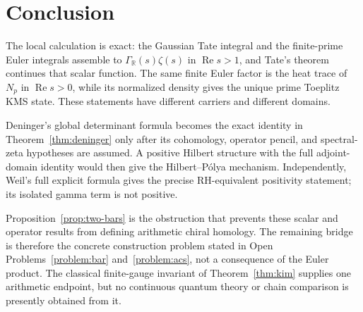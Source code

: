 \documentclass[11pt]{article}
\theoremstyle{plain}
\theoremstyle{definition}
\theoremstyle{remark}
\newcommand{\GammaR}{\Gamma_{\mathbb R}}
\begin{document}
\section{Conclusion}

The local calculation is exact: the Gaussian Tate integral and the
finite-prime Euler integrals assemble to \(\GammaR(s)\zeta(s)\) in
\(\operatorname{Re}s>1\), and Tate's theorem continues that scalar
function.  The same finite Euler factor is the heat trace of \(N_p\) in
\(\operatorname{Re}s>0\), while its normalized density gives the unique
prime Toeplitz KMS state.  These statements have different carriers and
different domains.

Deninger's global determinant formula becomes the exact identity in
Theorem~\ref{thm:deninger} only after its cohomology, operator pencil, and
spectral-zeta hypotheses are assumed.  A positive Hilbert structure with
the full adjoint-domain identity would then give the Hilbert--P\'olya
mechanism.  Independently, Weil's full explicit formula gives the precise
RH-equivalent positivity statement; its isolated gamma term is not
positive.

Proposition~\ref{prop:two-bars} is the obstruction that prevents these
scalar and operator results from defining arithmetic chiral homology.  The
remaining bridge is therefore the concrete construction problem stated in
Open Problems~\ref{problem:bar} and~\ref{problem:acs}, not a consequence of
the Euler product.  The classical finite-gauge invariant of
Theorem~\ref{thm:kim} supplies one arithmetic endpoint, but no continuous
quantum theory or chain comparison is presently obtained from it.
\end{document}
